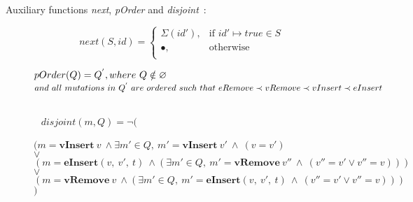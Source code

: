 \begin{frame}
Auxiliary functions \emph{next}, \emph{pOrder} and \emph{disjoint}~:
\begin{tiny}
\begin{figure}
\begin{center}
\[
    next(S, id)= 
\begin{cases}
    \Sigma(id'), & \text{if } id' \mapsto true \in S\\
    \bullet,              & \text{otherwise}\\
\end{cases}
\]

$\begin{array}{@{}l@{~}l@{\quad}l@{\!\!\!\!\!\!}r}
 pOrder(Q) = Q^{'}, where~Q \notin \varnothing
\end{array}
$
$\begin{array}{@{}l@{~}l@{\quad}l@{\!\!\!\!\!\!}r}
and~all~mutations~in~Q^{'}~are~ordered~such~that~eRemove \prec vRemove \prec vInsert \prec eInsert\\ 
\end{array}
$

$\begin{array}{@{}l@{~}l@{\quad}l@{\!\!\!\!\!\!}r}
\\
\\
\\
\end{array}
$
$disjoint(m, Q) = \neg($\\
$(m = \textbf{vInsert}~v~\wedge \exists m' \in Q,~m' = \textbf{vInsert}~v'~\wedge~(v=v')$\\
$\vee $\\
$(m = \textbf{eInsert} (v,~v',~t)~\wedge (\exists m' \in Q,~m' = \textbf{vRemove}~v''~\wedge~(v''=v'\vee v'' = v)))$\\
$\vee $\\
$(m = \textbf{vRemove}~v~\wedge (\exists m' \in Q,~m' = \textbf{eInsert} (v,~v',~t)~\wedge~(v''=v'\vee v'' = v)))$\\
$)$


\end{center}
\label{fig-auxFunc}
\end{figure}
\end{tiny}
\end{frame}

